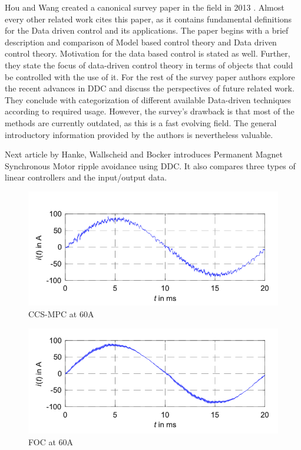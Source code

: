 \documentclass[]{final_report}
\begin{document}
Hou and Wang created a canonical survey paper in the field in 2013 \cite{hou2013model}. Almost every other related work cites this paper, as it contains fundamental definitions for the Data driven control and its applications. The paper begins with a brief description and comparison of Model based control theory and Data driven control theory. Motivation for the data based control is stated as well. Further, they state the focus of data-driven control theory in terms of objects that could be controlled with the use of it. For the rest of the survey paper authors explore the recent advances in DDC and discuss the perspectives of future related work. They conclude with categorization of different available Data-driven techniques according to required usage. However, the survey's drawback is that most of the methods are currently outdated, as this is a fast evolving field. The general introductory information provided by the authors is nevertheless valuable.



Next article by Hanke, Wallscheid and Bocker \cite{hanke2019continuous}  introduces Permanent Magnet Synchronous Motor ripple avoidance using DDC. It also compares three types of linear controllers and the input/output data.

\begin{figure} [h!]
\centerline{\includegraphics[width=.75\textwidth]{Screenshots for related work/Asset p1/Asset p1p1.png}}
\caption{CCS-MPC at 60A
\cite{hanke2019continuous}}
\label{fig:p1p1}
\end{figure}

\begin{figure} [h!]
\centerline{\includegraphics[width=.75\textwidth]{Screenshots for related work/Asset p1/Asset p1p2.png}}
\caption{FOC at 60A
\cite{hanke2019continuous}}
\label{fig:p1p2}
\end{figure}
\end{document}
